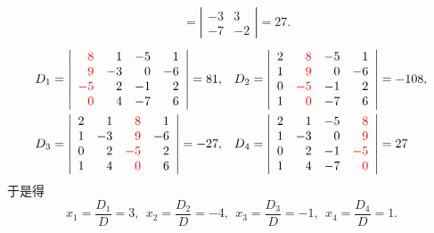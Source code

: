 \begin{jie}
$$\begin{array}{ll}
      & =\left| 
        \begin{array}{rr}
          -3 &  3\\
          -7 & -2
        \end{array}
               \right| = 27.
  \end{array}
  $$
  $$
  \begin{aligned}
    D_1 = \left|
      \begin{array}{rrrr}
        \textcolor{red}{8}  &  1 & -5 &  1\\
        \textcolor{red}{9}  & -3 &  0 & -6\\
        \textcolor{red}{-5} &  2 & -1 &  2\\
        \textcolor{red}{0}  &  4 & -7 &  6
      \end{array}
    \right|= 81, & \quad
    D_2 = \left|
      \begin{array}{rrrr}
        2 & \textcolor{red}{8}  & -5 &  1\\
        1 & \textcolor{red}{9}  &  0 & -6\\
        0 & \textcolor{red}{-5} & -1 &  2\\
        1 & \textcolor{red}{0}  & -7 &  6
      \end{array}
    \right|=-108,\\
    D_3 = \left|
      \begin{array}{rrrr}
        2  &  1 & \textcolor{red}{8}  &  1\\
        1  & -3 & \textcolor{red}{9}  & -6\\
        0  &  2 & \textcolor{red}{-5} &  2\\
        1  &  4 & \textcolor{red}{0}  &  6
      \end{array}
    \right|= -27, & \quad
    D_4 = \left|
      \begin{array}{rrrr}
        2 &  1 & -5 & \textcolor{red}{8} \\
        1 & -3 &  0 & \textcolor{red}{9} \\
        0 &  2 & -1 & \textcolor{red}{-5}\\
        1 &  4 & -7 & \textcolor{red}{0} 
      \end{array}
    \right|= 27
  \end{aligned}
  $$
  于是得
  $$
  x_1 = \frac{D_1}D = 3,  \ \ 
  x_2 = \frac{D_2}D = -4, \ \ 
  x_3 = \frac{D_3}D = -1, \ \ 
  x_4 = \frac{D_4}D = 1.
  $$
\end{jie}


